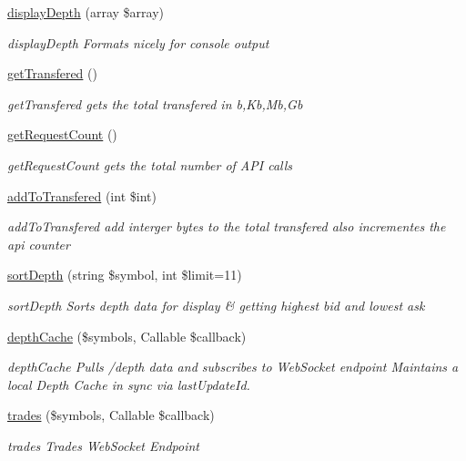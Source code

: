 \begin{DoxyCompactItemize}
\hyperlink{classBinance_1_1API_a184430be210c8e5cb7be80c9e239619f}{display\-Depth} (array \$array)
\begin{DoxyCompactList}\small\item\em display\-Depth Formats nicely for console output \end{DoxyCompactList}\item 
\hyperlink{classBinance_1_1API_ae1688d4d245b8f22a87c7afb1db5432a}{get\-Transfered} ()
\begin{DoxyCompactList}\small\item\em get\-Transfered gets the total transfered in b,Kb,Mb,Gb \end{DoxyCompactList}\item 
\hyperlink{classBinance_1_1API_abfb76ae473557ff989bee3287d3c437c}{get\-Request\-Count} ()
\begin{DoxyCompactList}\small\item\em get\-Request\-Count gets the total number of A\-P\-I calls \end{DoxyCompactList}\item 
\hyperlink{classBinance_1_1API_a90daef87526a753473580139c04d311b}{add\-To\-Transfered} (int \$int)
\begin{DoxyCompactList}\small\item\em add\-To\-Transfered add interger bytes to the total transfered also incrementes the api counter \end{DoxyCompactList}\item 
\hyperlink{classBinance_1_1API_a61742a5bdff7fc2119ab8b797c0cef4e}{sort\-Depth} (string \$symbol, int \$limit=11)
\begin{DoxyCompactList}\small\item\em sort\-Depth Sorts depth data for display \& getting highest bid and lowest ask \end{DoxyCompactList}\item 
\hyperlink{classBinance_1_1API_a9960b45d3a9eee17d8ec9b8f3d9bf060}{depth\-Cache} (\$symbols, Callable \$callback)
\begin{DoxyCompactList}\small\item\em depth\-Cache Pulls /depth data and subscribes to  Web\-Socket endpoint Maintains a local Depth Cache in sync via last\-Update\-Id. \end{DoxyCompactList}\item 
\hyperlink{classBinance_1_1API_a338fb6baf24bf3723bcb1fe19fb4ff67}{trades} (\$symbols, Callable \$callback)
\begin{DoxyCompactList}\small\item\em trades Trades Web\-Socket Endpoint \end{DoxyCompactList}\item 

\end{DoxyCompactItemize}
